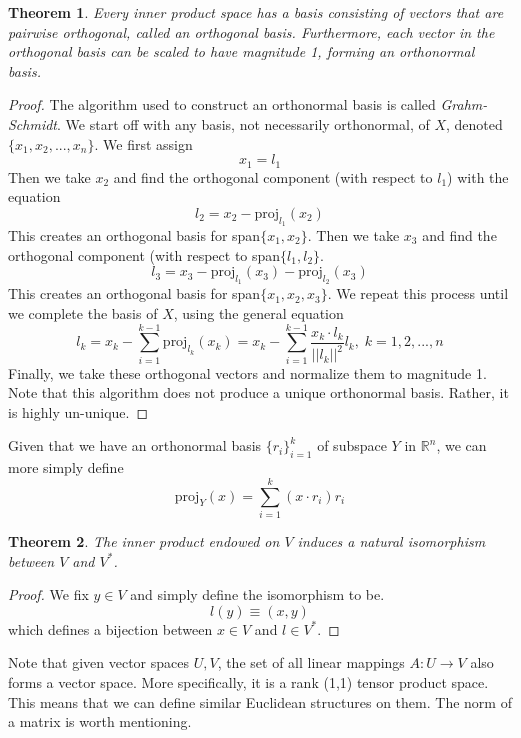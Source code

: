 \documentclass{article}
\newtheorem{theorem}{Theorem}[section]
\theoremstyle{remark}
\theoremstyle{definition}
\begin{document}
  \begin{theorem}
  Every inner product space has a basis consisting of vectors that are pairwise orthogonal, called an \textit{orthogonal basis}. Furthermore, each vector in the orthogonal basis can be scaled to have magnitude 1, forming an \textit{orthonormal basis}.  
  \end{theorem}

  \begin{proof}
  The algorithm used to construct an orthonormal basis is called \textit{Grahm-Schmidt}. We start off with any basis, not necessarily orthonormal, of $X$, denoted $\{x_1, x_2, ..., x_n\}$. We first assign 
  \[x_1 = l_1\]
  Then we take $x_2$ and find the orthogonal component (with respect to $l_1$) with the equation
  \[l_2 = x_2 - \text{proj}_{l_1} (x_2)\]
  This creates an orthogonal basis for span$\{x_1, x_2\}$. Then we take $x_3$ and find the orthogonal component (with respect to span$\{l_1, l_2\}$. 
  \[l_3 = x_3 - \text{proj}_{l_1} (x_3) - \text{proj}_{l_2} (x_3)\]
  This creates an orthogonal basis for span$\{x_1, x_2, x_3\}$. We repeat this process until we complete the basis of $X$, using the general equation
  \[l_k = x_k - \sum_{i=1}^{k-1} \text{proj}_{l_k} (x_k) = x_k - \sum_{i=1}^{k-1} \frac{x_k \cdot l_k}{||l_k||^2} l_k, \; k = 1, 2, ..., n\]
  Finally, we take these orthogonal vectors and normalize them to magnitude 1. Note that this algorithm does not produce a unique orthonormal basis. Rather, it is highly un-unique. 
  \end{proof}

  Given that we have an orthonormal basis $\{r_i\}_{i=1}^k$ of subspace $Y$ in $\mathbb{R}^n$, we can more simply define 
  \[ \text{proj}_Y (x) = \sum_{i=1}^k (x \cdot r_i) r_i \]

  \begin{theorem}
  The inner product endowed on $V$ induces a natural isomorphism between $V$ and $V^*$. 
  \end{theorem}
  \begin{proof}
  We fix $y \in V$ and simply define the isomorphism to be. 
  \[ l(y) \equiv (x, y)\]
  which defines a bijection between $x \in V$ and $l \in V^*$. 
  \end{proof}

  Note that given vector spaces $U, V$, the set of all linear mappings $A: U \longrightarrow V$ also forms a vector space. More specifically, it is a rank (1,1) tensor product space. This means that we can define similar Euclidean structures on them. The norm of a matrix is worth mentioning. 
\end{document}

